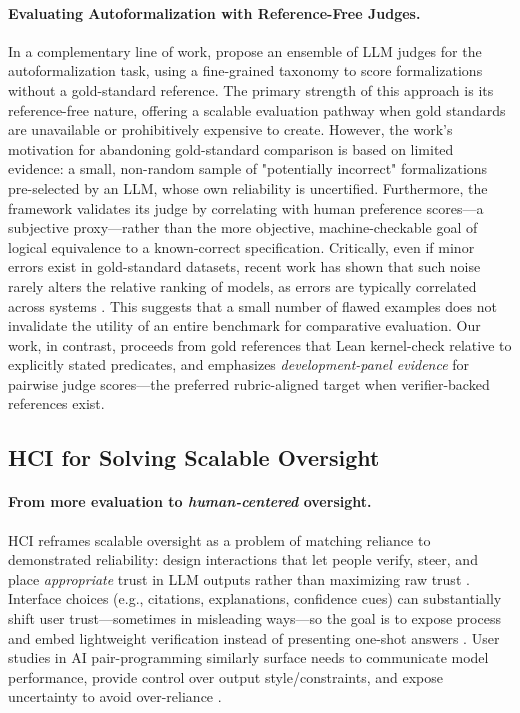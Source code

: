 \documentclass{article}
\begin{document}
\paragraph{Evaluating Autoformalization with Reference-Free Judges.}
In a complementary line of work, \citet{zhang2025goldstandardsepistemicensemble} propose an ensemble of LLM judges for the autoformalization task, using a fine-grained taxonomy to score formalizations without a gold-standard reference.
The primary strength of this approach is its reference-free nature, offering a scalable evaluation pathway when gold standards are unavailable or prohibitively expensive to create.
However, the work's motivation for abandoning gold-standard comparison is based on limited evidence: a small, non-random sample of "potentially incorrect" formalizations pre-selected by an LLM, whose own reliability is uncertified.
Furthermore, the framework validates its judge by correlating with human preference scores—a subjective proxy—rather than the more objective, machine-checkable goal of logical equivalence to a known-correct specification.
Critically, even if minor errors exist in gold-standard datasets, recent work has shown that such noise rarely alters the relative ranking of models, as errors are typically correlated across systems \citep{salaudeen2024imagenot}.
This suggests that a small number of flawed examples does not invalidate the utility of an entire benchmark for comparative evaluation.
Our work, in contrast, proceeds from gold references that Lean kernel-check relative to explicitly stated predicates, and emphasizes \emph{development-panel evidence} for pairwise judge scores---the preferred rubric-aligned target when verifier-backed references exist.

\subsection{HCI for Solving Scalable Oversight}

\paragraph{From more evaluation to \emph{human-centered} oversight.}
HCI reframes scalable oversight as a problem of matching reliance to demonstrated reliability: design interactions that let people verify, steer, and place \emph{appropriate} trust in LLM outputs rather than maximizing raw trust \citep{bach2022trusthci}. Interface choices (e.g., citations, explanations, confidence cues) can substantially shift user trust---sometimes in misleading ways---so the goal is to expose process and embed lightweight verification instead of presenting one-shot answers \citep{ding2025citations}. User studies in AI pair-programming similarly surface needs to communicate model performance, provide control over output style/constraints, and expose uncertainty to avoid over-reliance \citep{wang2024trustcode}.%
\end{document}
